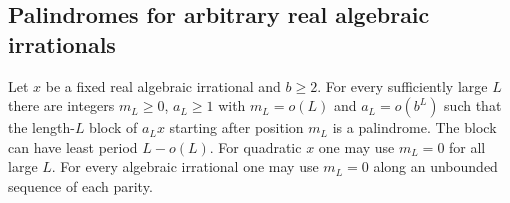 \subsection{Palindromes for arbitrary real algebraic irrationals}

\begin{theorem}\label{thm:pal-mult}
Let $x$ be a fixed real algebraic irrational and $b\ge2$. For every sufficiently large $L$ there are integers $m_L\ge0$, $a_L\ge1$ with $m_L=o(L)$ and $a_L=o(b^L)$ such that the length-$L$ block of $a_Lx$ starting after position $m_L$ is a palindrome. The block can have least period $L-o(L)$. For quadratic $x$ one may use $m_L=0$ for all large $L$. For every algebraic irrational one may use $m_L=0$ along an unbounded sequence of each parity.
\end{theorem}


